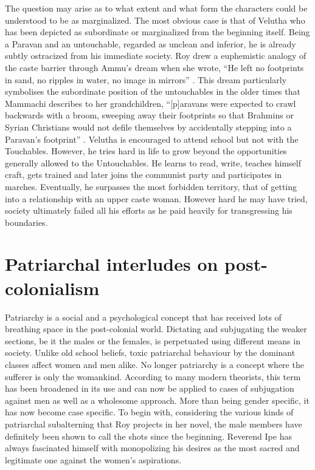 The question may arise as to what extent and what form the characters could be understood to be as marginalized. The most obvious case is that of Velutha who has been depicted as subordinate or marginalized from the beginning itself. Being a Paravan and an untouchable, regarded as unclean and inferior, he is already subtly ostracized from his immediate society. Roy drew a euphemistic analogy of the caste barrier through Ammu's dream when she wrote, ``He left no footprints in sand, no ripples in water, no image in mirrors'' \parencite[206]{Roy1997}. This dream particularly symbolises the subordinate position of the untouchables in the older times that Mammachi describes to her grandchildren,  ``[p]aravans were expected to crawl backwards with a broom, sweeping away their footprints so that Brahmins or Syrian Christians would not defile themselves by accidentally stepping into a Paravan's footprint'' \parencite[71]{Roy1997}. Velutha is encouraged to attend school but not with the Touchables. However, he tries hard in life to grow beyond the opportunities generally allowed to the Untouchables. He learns to read, write, teaches himself craft, gets trained and later joins the communist party and participates in marches. Eventually, he surpasses the most forbidden territory, that of getting into a relationship with an upper caste woman. However hard he may have tried, society ultimately failed all his efforts as he paid heavily for transgressing his boundaries. 

\section{Patriarchal interludes on post-colonialism}

Patriarchy is a social and a psychological concept that has received lots of breathing space in the post-colonial world. Dictating and subjugating the weaker sections, be it the males or the females, is perpetuated using different means in society. Unlike old school beliefs, toxic patriarchal behaviour by the dominant classes affect women and men alike. No longer patriarchy is a concept where the sufferer is only the womankind. According to many modern theorists, this term has been broadened in its use and can now be applied to cases of subjugation against men as well as a wholesome approach. More than being gender specific, it has now become case specific. To begin with, considering the various kinds of patriarchal subalterning that Roy projects in her novel, the male members have definitely been shown to call the shots since the beginning. Reverend Ipe has always fascinated himself with monopolizing his desires as the most sacred and legitimate one against the women's aspirations. 


